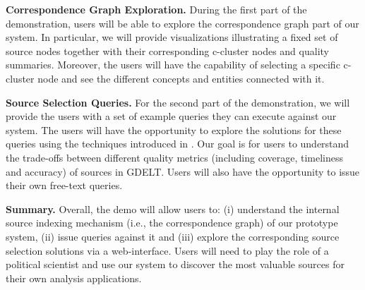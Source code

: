 \documentclass{sig-alternate}
\begin{document}
\vspace{3pt}\noindent\textbf{Correspondence Graph Exploration.} During the first part of the demonstration, users will be able to explore the correspondence graph part of our system. In particular, we will provide visualizations illustrating a fixed set of source nodes together with their corresponding c-cluster nodes and quality summaries. Moreover, the users will have the capability of selecting a specific c-cluster node and see the different concepts and entities connected with it.

\vspace{3pt}\noindent\textbf{Source Selection Queries.} For the second part of the demonstration, we will provide the users with a set of example queries they can execute against our system. The users will have the opportunity to explore the solutions for these queries using the techniques introduced in . Our goal is for users to understand the trade-offs between different quality metrics (including coverage, timeliness and accuracy) of sources in GDELT. Users will also have the opportunity to issue their own free-text queries.

\vspace{3pt}\noindent\textbf{Summary.} Overall, the demo will allow users to: (i) understand the internal source indexing mechanism (i.e., the correspondence graph) of our prototype system, (ii) issue queries against it and (iii) explore the corresponding source selection solutions via a web-interface. Users will need to play the role of a political scientist and use our system to discover the most valuable sources for their own analysis applications.
\end{document}
